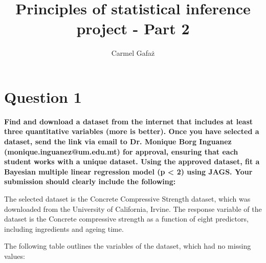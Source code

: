 \documentclass[]{article}
\title{Principles of statistical inference project - Part 2}
\author{Carmel Gafaż}
\begin{document}
\maketitle



\section{Question 1}

\textbf{Find and download a dataset from the internet that includes at least three quantitative
variables (more is better). Once you have selected a dataset, send the link via email to Dr.
Monique Borg Inguanez (monique.inguanez@um.edu.mt) for approval, ensuring that each
student works with a unique dataset.
Using the approved dataset, fit a Bayesian multiple linear regression model (p < 2) using
JAGS.
Your submission should clearly include the following:}

\bigskip

The selected dataset is the Concrete Compressive Strength dataset, which was downloaded from the University of California, Irvine. The response variable of the dataset is the Concrete compressive strength as a function of eight predictors, including ingredients and ageing time.

The following table outlines the variables of the dataset, which had no missing values:
\end{document}
